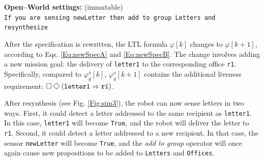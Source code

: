 \begin{algorithm}
{%
	
	\textbf{Open--World settings:} (immutable)\\
	\texttt{If you are sensing newLetter then add to group Letters and resynthesize}\\
		
	}
	\vspace{-8 pt}
\end{algorithm}
\vspace{-5 pt}

After the specification is rewritten, the LTL formula $\varphi [k]$ changes to $\varphi [k+1]$, according to Eqs. \eqref{Eq:newSpecA} and \eqref{Eq:newSpecB}. The change involves adding a new mission goal: the delivery of \texttt{letter1} to the corresponding office \texttt{r1}. Specifically, compared to $\varphi_g^s [k]$, $\varphi_g^s [k+1]$ contains the additional liveness requirement:
$\G\F\left( \texttt{letter1} \Rightarrow \texttt{r1} \right)$.

After resynthesis (see Fig. \ref{Fig:sim3}), the robot can now sense letters in two ways. First, it could detect a letter addressed to the same recipient as \texttt{letter1}. In this case, \texttt{letter1} will become \texttt{True}, and the robot will deliver the letter to \texttt{r1}. Second, it could detect a letter addressed to a new recipient. In that case, the sensor \texttt{newLetter} will become \texttt{True}, and the \emph{add to group} operator will once again cause new propositions to be added to \texttt{Letters} and \texttt{Offices}.

